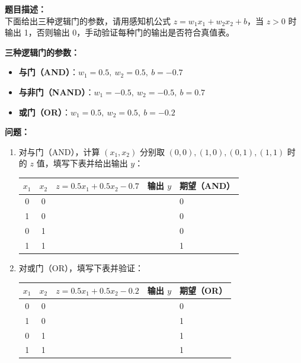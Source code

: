 \documentclass[a4paper,11pt]{ctexart}
\begin{document}
\begin{problembox}
    \textbf{题目描述：}\\
    下面给出三种逻辑门的参数，请用感知机公式 $z = w_1 x_1 + w_2 x_2 + b$，当 $z > 0$ 时输出 1，否则输出 0，手动验证每种门的输出是否符合真值表。

    \vspace{0.3cm}
    \textbf{三种逻辑门的参数：}
    \begin{itemize}
        \item \textbf{与门（AND）}：$w_1 = 0.5,\ w_2 = 0.5,\ b = -0.7$
        \item \textbf{与非门（NAND）}：$w_1 = -0.5,\ w_2 = -0.5,\ b = 0.7$
        \item \textbf{或门（OR）}：$w_1 = 0.5,\ w_2 = 0.5,\ b = -0.2$
    \end{itemize}

    \vspace{0.2cm}
    \textbf{问题：}
    \begin{enumerate}[(1)]
        \item 对与门（AND），计算 $(x_1, x_2)$ 分别取 $(0,0), (1,0), (0,1), (1,1)$ 时的 $z$ 值，填写下表并给出输出 $y$：

        \begin{center}
        \begin{tabular}{ccccl}
            \toprule
            $x_1$ & $x_2$ & $z = 0.5x_1 + 0.5x_2 - 0.7$ & 输出 $y$ & 期望（AND） \\
            \midrule
            0 & 0 & \underline{\quad\quad} & \underline{\quad} & 0 \\
            1 & 0 & \underline{\quad\quad} & \underline{\quad} & 0 \\
            0 & 1 & \underline{\quad\quad} & \underline{\quad} & 0 \\
            1 & 1 & \underline{\quad\quad} & \underline{\quad} & 1 \\
            \bottomrule
        \end{tabular}
        \end{center}

        \item 对或门（OR），填写下表并验证：

        \begin{center}
        \begin{tabular}{ccccl}
            \toprule
            $x_1$ & $x_2$ & $z = 0.5x_1 + 0.5x_2 - 0.2$ & 输出 $y$ & 期望（OR） \\
            \midrule
            0 & 0 & \underline{\quad\quad} & \underline{\quad} & 0 \\
            1 & 0 & \underline{\quad\quad} & \underline{\quad} & 1 \\
            0 & 1 & \underline{\quad\quad} & \underline{\quad} & 1 \\
            1 & 1 & \underline{\quad\quad} & \underline{\quad} & 1 \\
            \bottomrule
        \end{tabular}
        \end{center}


\end{enumerate}
\end{problembox}
\end{document}

